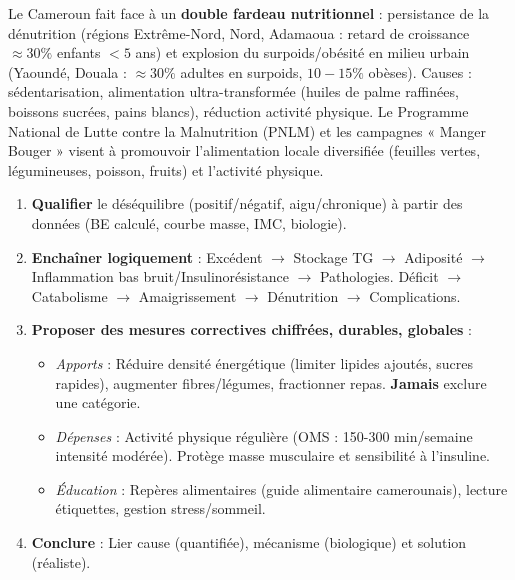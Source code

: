 \documentclass[11pt]{article}
\begin{document}
\begin{savaistu}
Le Cameroun fait face à un \textbf{double fardeau nutritionnel} : persistance de la dénutrition (régions Extrême-Nord, Nord, Adamaoua : retard de croissance $\approx 30\%$ enfants $<5$ ans) et explosion du surpoids/obésité en milieu urbain (Yaoundé, Douala : $\approx 30\%$ adultes en surpoids, $10-15\%$ obèses). Causes : sédentarisation, alimentation ultra-transformée (huiles de palme raffinées, boissons sucrées, pains blancs), réduction activité physique. Le Programme National de Lutte contre la Malnutrition (PNLM) et les campagnes « Manger Bouger » visent à promouvoir l'alimentation locale diversifiée (feuilles vertes, légumineuses, poisson, fruits) et l'activité physique.
\end{savaistu}

\begin{methode}
\begin{enumerate}
\item \textbf{Qualifier} le déséquilibre (positif/négatif, aigu/chronique) à partir des données (BE calculé, courbe masse, IMC, biologie).
\item \textbf{Enchaîner logiquement} : Excédent $\rightarrow$ Stockage TG $\rightarrow$ Adiposité $\rightarrow$ Inflammation bas bruit/Insulinorésistance $\rightarrow$ Pathologies. Déficit $\rightarrow$ Catabolisme $\rightarrow$ Amaigrissement $\rightarrow$ Dénutrition $\rightarrow$ Complications.
\item \textbf{Proposer des mesures correctives \textbf{chiffrées, durables, globales}} :
\begin{itemize}
\item \textit{Apports} : Réduire densité énergétique (limiter lipides ajoutés, sucres rapides), augmenter fibres/légumes, fractionner repas. \textbf{Jamais} exclure une catégorie.
\item \textit{Dépenses} : Activité physique régulière (OMS : 150-300 min/semaine intensité modérée). Protège masse musculaire et sensibilité à l'insuline.
\item \textit{Éducation} : Repères alimentaires (guide alimentaire camerounais), lecture étiquettes, gestion stress/sommeil.
\end{itemize}
\item \textbf{Conclure} : Lier cause (quantifiée), mécanisme (biologique) et solution (réaliste).
\end{enumerate}
\end{methode}
\end{document}
